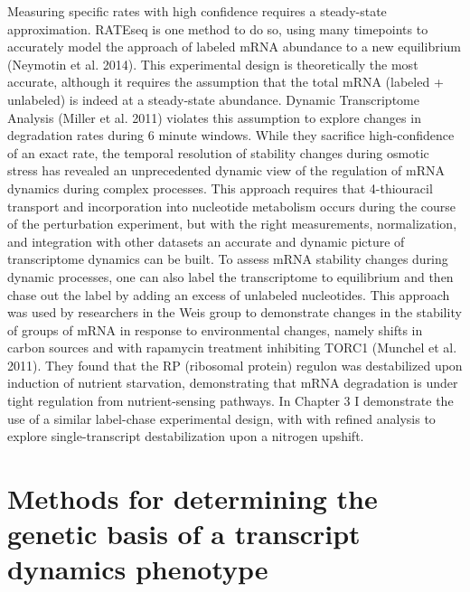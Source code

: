 Measuring specific rates with high confidence
requires a steady-state approximation. RATEseq is one method to do so,
using many timepoints to accurately model the approach of labeled mRNA
abundance to a new equilibrium (Neymotin et al. 2014). This
experimental design is theoretically the most accurate, although it
requires the assumption that the total mRNA (labeled + unlabeled) is
indeed at a steady-state abundance. Dynamic Transcriptome Analysis
(Miller et al. 2011) violates this assumption to explore changes in
degradation rates during 6 minute windows. While they sacrifice
high-confidence of an exact rate, the temporal resolution of stability
changes during osmotic stress has revealed an unprecedented dynamic
view of the regulation of mRNA dynamics during complex processes. This
approach requires that 4-thiouracil transport and incorporation into
nucleotide metabolism occurs during the course of the perturbation
experiment, but with the right measurements, normalization, and
integration with other datasets an accurate and dynamic picture of
transcriptome dynamics can be built. To assess mRNA stability changes
during dynamic processes, one can also label the transcriptome to
equilibrium and then chase out the label by adding an excess of
unlabeled nucleotides. This approach was used by researchers in the
Weis group to demonstrate changes in the stability of groups of mRNA
in response to environmental changes, namely shifts in carbon sources
and with rapamycin treatment inhibiting TORC1 (Munchel et al. 2011).
They found that the RP (ribosomal protein) regulon was destabilized
upon induction of nutrient starvation, demonstrating that mRNA
degradation is under tight regulation from nutrient-sensing pathways.
In Chapter 3 I demonstrate the use of a similar label-chase
experimental design, with with refined analysis to explore
single-transcript destabilization upon a nitrogen upshift.  

\section{Methods for determining the genetic basis of a transcript
dynamics phenotype}

